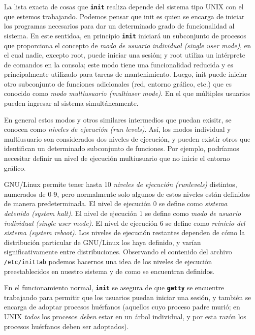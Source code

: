 \documentclass[12pt]{article}
\begin{document}
La lista exacta de cosas que \texttt{\textbf{init}} realiza depende del 
sistema tipo UNIX con el que estemos trabajando. Podemos pensar que init
es quien se encarga de iniciar los programas necesarios para dar 
un determinado grado de funcionalidad al sistema. En este sentidoa, en
principio 
\texttt{\textbf{init}} iniciará un subconjunto de procesos que 
proporciona el concepto de \textit{modo de usuario individual
 (single user mode)}, en el cual nadie, excepto root, puede iniciar una 
sesión; y root utiliza un intérprete de comandos en la consola; este 
modo tiene una funcionalidad reducida y es principalmente utilizado 
para tareas de mantenimiento. Luego, init puede iniciar otro subconjunto 
de funciones adicionales (red, entorno gráfico, etc.) que es conocido 
como \textit{modo multiusuario (multiuser mode)}. En el que múltiples 
usuarios pueden ingresar al sistema simultáneamente.

En general estos modos y otros similares intermedios que puedan exisitr, 
se conocen como \textit{niveles de ejecución (run levels)}. Así, los 
modos individual y multiusuario son considerados dos niveles de ejecución,
y pueden existir otros que identifican un determinado subconjunto de 
funciones. Por ejemplo, podríamos necesitar definir un nivel de ejecución
multiusuario que no inicie el entorno gráfico. 


 GNU/Linux permite tener hasta 10 \textit{niveles de ejecución 
(runlevels)} distintos, numerados de 0-9, pero normalmente solo algunos 
de estos  niveles están definidos de manera predeterminada. El nivel de 
ejecución 0 se define como \textit{sistema detenido (system halt)}. 
El nivel de  ejecución 1 se define como \textit{modo de usuario individual
 (single user mode)}. El nivel de ejecución 6 se define como 
\textit{reinicio del sistema (system reboot)}. Los niveles de ejecución 
restantes dependen de cómo la distribución particular
de GNU/Linux los haya definido, y varían significativamente entre
distribuciones. Observando el contenido del archivo
\texttt{/etc/inittab} podemos hacernos una idea de los niveles de
ejecución preestablecidos en nuestro sistema y de como se encuentran
definidos.

En el funcionamiento normal, \texttt{\textbf{init}} se asegura de que
\texttt{\textbf{getty}} se encuentre trabajando para permitir que los 
usuarios puedan iniciar una sesión, y también se encarga de adoptar 
procesos huérfanos (aquellos cuyo proceso padre murió; en UNIX \textit{todos} los procesos \textit{deben} estar
en un árbol individual, y por esta razón los procesos huérfanos deben ser
adoptados).  
\end{document}
